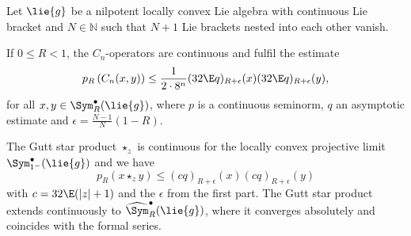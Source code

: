 \begin{theorem}
    \label{Nilpot:Thm:ProjLimit}%
    Let $\lie{g}$ be a nilpotent locally convex Lie algebra with
    continuous Lie bracket and $N \in \mathbb{N}$ such that $N + 1$
    Lie brackets nested into each other vanish.
    \begin{theoremlist}
	    	\item \label{item:Nilpot:CnOperators}
	    	If $0 \leq R < 1$, the $C_n$-operators are continuous and fulfil the 
	    	estimate
	    	\begin{equation}
	    		\label{eq:Nilpot:CnOperators}
	    		p_R \left(
	    			C_n (x, y)
	    		\right)
	    		\leq
	    		\frac{1}{2 \cdot 8^n}
	    		(32 \E q)_{R + \epsilon}(x)
	    		(32 \E q)_{R + \epsilon}(y),
	    	\end{equation}
	    	for all $x, y \in \Sym_R^{\bullet}(\lie{g})$, where $p$ is a 
	    	continuous seminorm, $q$ an asymptotic estimate and 
	    	$\epsilon = \frac{N - 1}{N}(1 - R)$.
	    	
	    	\item \label{item_Nilpot:SEinsMinus}
	    	The Gutt star product $\star_z$ is continuous for the locally convex 
	    	projective limit $\Sym_{1^-}^\bullet(\lie{g})$ and we have
	    	\begin{equation}
	    		\label{eq:Nilpot:Continuity}
	    		p_R \left(
	    			x \star_z y
	    		\right)
	    		\leq
	    		(c q)_{R + \epsilon}(x)
	    		(c q)_{R + \epsilon}(y)
	    	\end{equation}
	    	with $c = 32 \E (|z| +1)$ and the $\epsilon$ from the first part.
	    	The Gutt star product extends continuously to
	    	$\widehat{\Sym}_R^{\bullet}(\lie{g})$, where it converges absolutely 
	    	and coincides with the formal series.
    \end{theoremlist}
\end{theorem}
